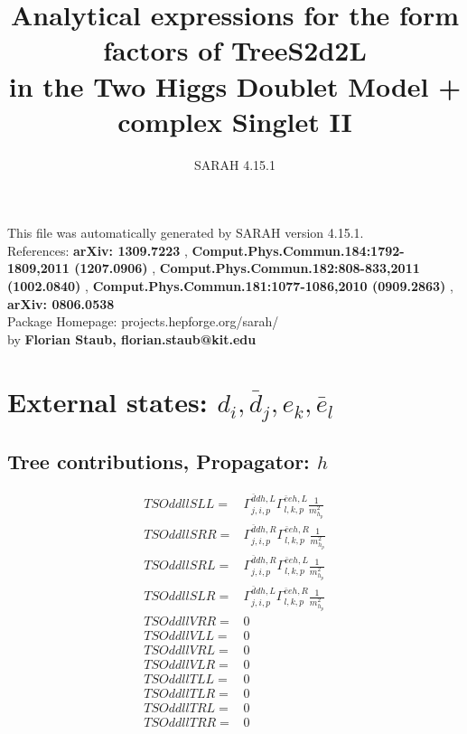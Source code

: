 \documentclass[A4,landscape]{article}
\begin{document}
\title{Analytical expressions for the form factors of TreeS2d2L\\ in the Two Higgs Doublet Model + complex Singlet II } 
 \author{SARAH 4.15.1} 
 \maketitle 
 \vspace{10cm} 
This file was automatically generated by SARAH version 4.15.1.  \\ 
References: {\bf arXiv: 1309.7223 }, {\bf Comput.Phys.Commun.184:1792-1809,2011 (1207.0906) }, {\bf Comput.Phys.Commun.182:808-833,2011 (1002.0840) }, {\bf Comput.Phys.Commun.181:1077-1086,2010 (0909.2863) }, {\bf arXiv: 0806.0538 } \\ 
Package Homepage: projects.hepforge.org/sarah/ \\ 
by {\bf Florian Staub, florian.staub@kit.edu} 
 \pagebreak 
 \tableofcontents 
 \pagebreak 
\section{External states: ${d_{{i}}, \bar{d}_{{j}}, e_{{k}}, \bar{e}_{{l}}}$} 
\subsection{Tree contributions, Propagator: $h$} 

\begin{align} 
  TSOddllSLL= & \Gamma^{\bar{d}d h ,L}_{j, i, p} \Gamma^{\bar{e}e h ,L}_{l, k, p} \frac{1}{m^2_{h_{{p}}}} \\ 
  TSOddllSRR= & \Gamma^{\bar{d}d h ,R}_{j, i, p} \Gamma^{\bar{e}e h ,R}_{l, k, p} \frac{1}{m^2_{h_{{p}}}} \\ 
  TSOddllSRL= & \Gamma^{\bar{d}d h ,R}_{j, i, p} \Gamma^{\bar{e}e h ,L}_{l, k, p} \frac{1}{m^2_{h_{{p}}}} \\ 
  TSOddllSLR= & \Gamma^{\bar{d}d h ,L}_{j, i, p} \Gamma^{\bar{e}e h ,R}_{l, k, p} \frac{1}{m^2_{h_{{p}}}} \\ 
  TSOddllVRR= & 0 \\ 
  TSOddllVLL= & 0 \\ 
  TSOddllVRL= & 0 \\ 
  TSOddllVLR= & 0 \\ 
  TSOddllTLL= & 0 \\ 
  TSOddllTLR= & 0 \\ 
  TSOddllTRL= & 0 \\ 
  TSOddllTRR= & 0 \\ 
\end{align} 
\end{document}
